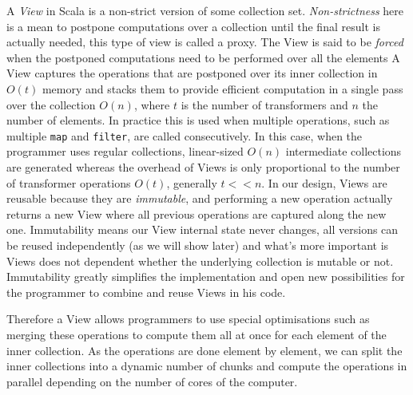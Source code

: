 \documentclass[a4paper,12pt,twocolumn]{article}
\begin{document}
A {\it View} in Scala is a non-strict version of some collection set.
{\it Non-strictness} here is a mean to postpone computations over a collection until the final result is actually needed, this type of view is called a proxy.
The View is said to be {\it forced} when the postponed computations need to be performed over all the elements %
A View captures the operations that are postponed over its inner collection in $O(t)$ memory and stacks them to provide efficient computation in a single pass over the collection $O(n)$, where $t$ is the number of transformers and $n$ the number of elements.
In practice this is used when multiple operations, such as multiple \verb|map| and \verb|filter|, are called consecutively.
In this case, when the programmer uses regular collections, linear-sized $O(n)$ intermediate collections are generated whereas the overhead of Views is only proportional to the number of transformer operations $O(t)$, generally $t << n$.
In our design, Views are reusable because they are {\it immutable}, and performing a new operation actually returns a new View where all previous operations are captured along the new one.
Immutability means our View internal state never changes, all versions can be reused independently (as we will show later) and what's more important is Views does not dependent whether the underlying collection is mutable or not.
Immutability greatly simplifies the implementation and open new possibilities for the programmer to combine and reuse Views in his code.

Therefore a View allows programmers to use special optimisations such as merging these operations to compute them all at once for each element of the inner collection.
As the operations are done element by element, we can split the inner collections into a dynamic number of chunks and compute the operations in parallel depending on the number of cores of the computer.
\end{document}
